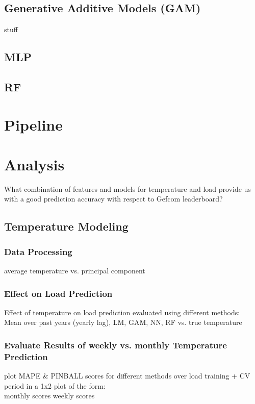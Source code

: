 \documentclass[conference]{IEEEtran}
\begin{document}
\subsection{Generative Additive Models (GAM)}
\vspace*{5cm}
stuff

\subsection{MLP}
\vspace*{2cm}

\subsection{RF}
\vspace*{2cm}

\section{Pipeline}
\vspace*{10cm}

\section{Analysis}
What combination of features and models for temperature and load provide us with a good prediction accuracy with respect to Gefcom leaderboard?

\subsection{Temperature Modeling}
\subsubsection{Data Processing}
average temperature vs. principal component

\subsubsection{Effect on Load Prediction}
Effect of temperature on load prediction evaluated using different methods:\\
Mean over past years (yearly lag), LM, GAM, NN, RF vs. true temperature

\subsubsection{Evaluate Results of weekly vs. monthly Temperature Prediction}
plot MAPE \& PINBALL scores for different methods over load training + CV period in a 1x2 plot of the form:\\
monthly scores \quad weekly scores
\end{document}
